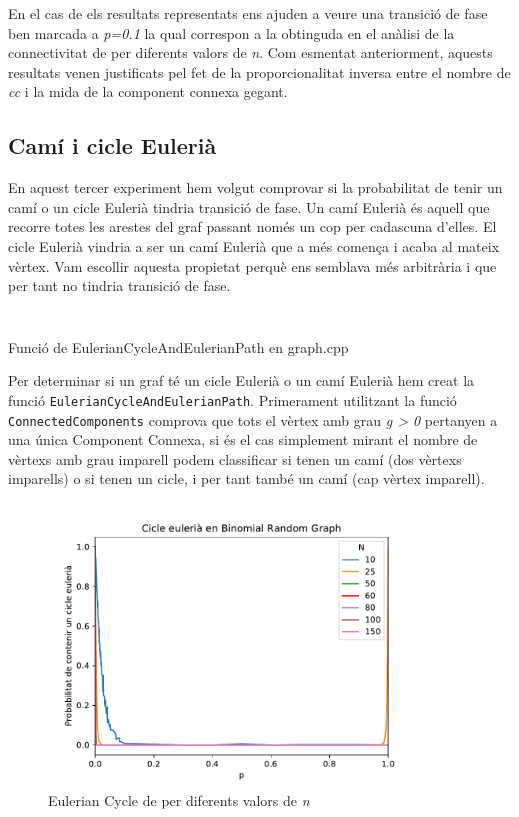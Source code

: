 En el cas de \RGG els resultats representats ens ajuden a veure una transició de fase ben marcada a \textit{p=0.1} la qual correspon a la obtinguda en el anàlisi de la connectivitat de \RGG per diferents valors de \textit{n}. Com esmentat anteriorment, aquests resultats venen justificats pel fet de la proporcionalitat inversa entre el nombre de \textit{cc} i la mida de la component connexa gegant. %

\subsection{Camí i cicle Eulerià}
En aquest tercer experiment hem volgut comprovar si la probabilitat de tenir un camí o un cicle Eulerià tindria transició de fase. Un camí Eulerià és aquell que recorre totes les arestes del graf passant només un cop per cadascuna d'elles. El cicle Eulerià vindria a ser un camí Eulerià que a més comença i acaba al mateix vèrtex. Vam escollir aquesta propietat perquè ens semblava més arbitrària i que per tant no tindria transició de fase.

\begin{listing}
\inputminted[firstline=8,lastline=8]{cpp}{src/graph.h}
\inputminted[firstline=60,lastline=81]{cpp}{src/graph.cpp}
\caption{Funció de EulerianCycleAndEulerianPath en graph.cpp}
\end{listing}

Per determinar si un graf té un cicle Eulerià o un camí Eulerià hem creat la funció \texttt{EulerianCycleAndEulerianPath}. Primerament utilitzant la funció \texttt{ConnectedComponents} comprova que tots el vèrtex amb grau \textit{g > 0} pertanyen a una única Component Connexa, si és el cas simplement mirant el nombre de vèrtexs amb grau imparell podem classificar si tenen un camí (dos vèrtexs imparells) o si tenen un cicle, i per tant també un camí (cap vèrtex imparell).

\begin{figure}[H]
    \centering
    \includegraphics[width=10cm]{plots/BRG_eulerianCycle.pdf}
    \caption{Eulerian Cycle de \BRG per diferents valors de \textit{n}}
    \label{fig:eu_cycle_BRG}
\end{figure}


